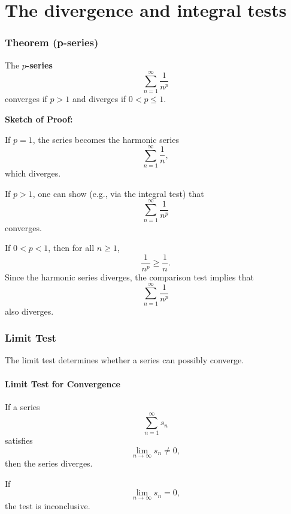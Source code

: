 \section{The divergence and integral tests}
\label{sec:thed-219c}


\subsubsection{Theorem (p-series)}
\label{sss:theo-5ce0}

The \textbf{$p$-series}
\[
\sum_{n=1}^{\infty} \frac{1}{n^p}
\]
converges if $p > 1$ and diverges if $0 < p \leq 1$.

\textbf{Sketch of Proof:}

If $p = 1$, the series becomes the harmonic series
\[
\sum_{n=1}^{\infty} \frac{1}{n},
\]
which diverges.

If $p > 1$, one can show (e.g., via the integral test) that
\[
\sum_{n=1}^{\infty} \frac{1}{n^p}
\]
converges.

If $0 < p < 1$, then for all $n \geq 1$,
\[
\frac{1}{n^p} \geq \frac{1}{n}.
\]
Since the harmonic series diverges, the comparison test implies that
\[
\sum_{n=1}^{\infty} \frac{1}{n^p}
\]
also diverges.

\subsubsection{Limit Test}
\label{sss:limi-19f1}

The limit test determines whether a series can possibly converge.

\paragraph{Limit Test for Convergence}

If a series
\[
\sum_{n=1}^{\infty} s_n
\]
satisfies
\[
\lim_{n \to \infty} s_n \neq 0,
\]
then the series diverges.

If
\[
\lim_{n \to \infty} s_n = 0,
\]
the test is inconclusive.

